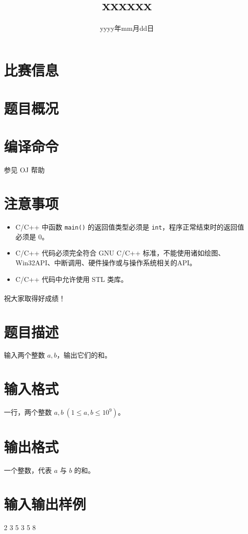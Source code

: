 \documentclass{ctpro}
\title{xxxxxx}
\date{yyyy年mm月dd日}
\begin{document}
\maketitle
{}

\section*{比赛信息}


\section*{题目概况}

\problemtab

\section*{编译命令}

参见 OJ 帮助

\section*{注意事项}

\begin{itemize}
	\item C/C++ 中函数 \verb|main()| 的返回值类型必须是 \verb|int|，程序正常结束时的返回值必须是 0。
	\item C/C++ 代码必须完全符合 GNU C/C++ 标准，不能使用诸如绘图、Win32API、中断调用、硬件操作或与操作系统相关的API。
	\item C/C++ 代码中允许使用 STL 类库。
\end{itemize}

\paragraph*{} 祝大家取得好成绩！

\makeproblem
\section*{题目描述}

输入两个整数 $a,b$，输出它们的和。

\section*{输入格式}

一行，两个整数 $a,b~(1 \leq a,b \leq 10^9)$。

\section*{输出格式}

一个整数，代表 $a$ 与 $b$ 的和。

\section*{输入输出样例}

\testcasetab
{
	2 3
}
{
	5
}
\testcasetab
{
	3 5
}
{
	8
}
\end{document}

